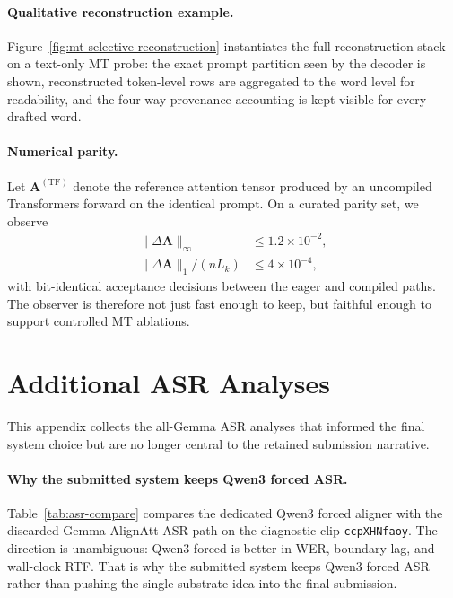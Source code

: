 \documentclass[11pt]{article}
\begin{document}
\paragraph{Qualitative reconstruction example.}
Figure~\ref{fig:mt-selective-reconstruction} instantiates the full
reconstruction stack on a text-only MT probe: the exact prompt
partition seen by the decoder is shown, reconstructed token-level rows are
aggregated to the word level for readability, and the four-way provenance
accounting is kept visible for every drafted word.


\paragraph{Numerical parity.}
Let $\mathbf{A}^{(\mathrm{TF})}$ denote the reference attention tensor produced
by an uncompiled Transformers forward on the identical prompt. On a curated
parity set, we observe
\begin{equation}
  \begin{aligned}
    \|\Delta\mathbf{A}\|_\infty &\leq 1.2 \times 10^{-2}, \\
    \|\Delta\mathbf{A}\|_1 / (nL_k) &\leq 4 \times 10^{-4},
  \end{aligned}
  \label{eq:parity}
\end{equation}
with bit-identical acceptance decisions between the eager and compiled paths.
The observer is therefore not just fast enough to keep, but faithful enough to
support controlled MT ablations.

\section{Additional ASR Analyses}
\label{sec:appendix-asr}

This appendix collects the all-Gemma ASR analyses that informed the final
system choice but are no longer central to the retained submission narrative.

\paragraph{Why the submitted system keeps Qwen3 forced ASR.}
Table~\ref{tab:asr-compare} compares the dedicated Qwen3 forced aligner with
the discarded Gemma AlignAtt ASR path on the diagnostic clip
\texttt{ccpXHNfaoy}. The direction is unambiguous: Qwen3 forced is better in
WER, boundary lag, and wall-clock RTF. That is why the submitted system keeps
Qwen3 forced ASR rather than pushing the single-substrate idea into the final
submission.
\end{document}
